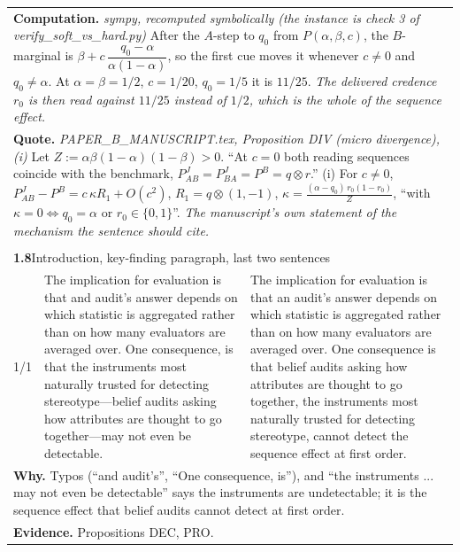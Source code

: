 \documentclass[10pt]{article}
\theoremstyle{definition}
\newlength{\fullw}\setlength{\fullw}{25.9cm}
\newcommand{\entryhead}[2]{\multicolumn{3}{|l|}{\rule{0pt}{2.6ex}\large\textbf{#1}\quad #2} \\ \hline}
\begin{document}
{\begin{longtable}{|p{0.9cm}|p{12.2cm}|p{12.2cm}|}
\multicolumn{3}{|p{\fullw}|}{\textbf{Computation.} \textit{sympy, recomputed symbolically (the instance is check 3 of verify\_soft\_vs\_hard.py)} \newline After the $A$-step to $q_0$ from $P(\alpha,\beta,c)$, the $B$-marginal is
$\beta + c\,\dfrac{q_0-\alpha}{\alpha(1-\alpha)}$, so the first cue moves it whenever
$c\neq0$ and $q_0\neq\alpha$. At $\alpha=\beta=1/2$, $c=1/20$, $q_0=1/5$ it is $11/25$. \newline \textit{The delivered credence $r_0$ is then read against $11/25$ instead of $1/2$, which is the whole of the sequence effect.}} \\
\multicolumn{3}{|p{\fullw}|}{\textbf{Quote.} \textit{PAPER\_B\_MANUSCRIPT.tex, Proposition DIV (micro divergence), (i)} \newline Let $Z:=\alpha\beta(1-\alpha)(1-\beta)>0$. ``At $c=0$ both reading sequences coincide
with the benchmark, $P^{J}_{AB}=P^{J}_{BA}=P^{B}=q\otimes r$.'' (i) For $c\neq0$,
$P^{J}_{AB}-P^{B}=c\,\kappa R_1+O(c^{2})$, $R_1=q\otimes(1,-1)$,
$\kappa=\frac{(\alpha-q_0)\,r_0(1-r_0)}{Z}$, ``with $\kappa=0\iff q_0=\alpha$ or
$r_0\in\{0,1\}$''. \newline \textit{The manuscript's own statement of the mechanism the sentence should cite.}} \\ \hline
\multicolumn{3}{|l|}{} \\ \hline
\entryhead{1.8}{Introduction, key-finding paragraph, last two sentences\quad{\footnotesize\textit{(formerly C.8)}}}
1/1 & The implication for evaluation is that and audit's answer depends on which statistic is aggregated rather than on how many evaluators are averaged over. One consequence, is that the instruments most naturally trusted for detecting stereotype---belief audits asking how attributes are thought to go together---may not even be detectable. & The implication for evaluation is that an audit's answer depends on which statistic is aggregated rather than on how many evaluators are averaged over. One consequence is that belief audits asking how attributes are thought to go together, the instruments most naturally trusted for detecting stereotype, cannot detect the sequence effect at first order. \\ \hline
\multicolumn{3}{|p{\fullw}|}{\textbf{Why.} Typos (``and audit's'', ``One consequence, is''), and ``the instruments ... may not even be detectable'' says the instruments are undetectable; it is the sequence effect that belief audits cannot detect at first order.} \\
\multicolumn{3}{|p{\fullw}|}{\textbf{Evidence.} Propositions DEC, PRO.} \\ \hline

\end{longtable}}
\end{document}
